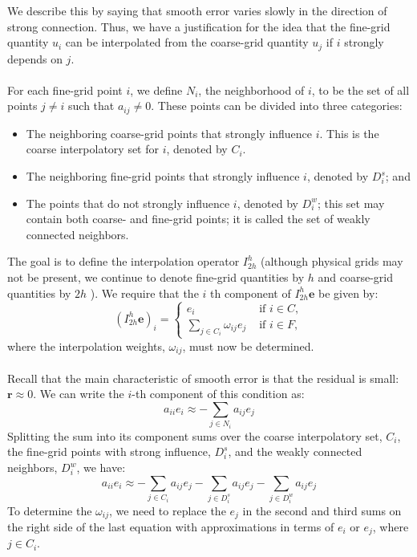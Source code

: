 \documentclass[11pt]{book}
\begin{document}
We describe this by saying that smooth error varies slowly in the direction of strong connection. Thus, we have a justification for the idea that the fine-grid quantity $u_{i}$ can be interpolated from the coarse-grid quantity $u_{j}$ if $i$ strongly depends on $j$.\\ \\
For each fine-grid point $i$, we define $N_{i}$, the neighborhood of $i$, to be the set of all points $j \neq i$ such that $a_{i j} \neq 0$. These points can be divided into three categories:
\begin{itemize}
  \item The neighboring coarse-grid points that strongly influence $i$. This is the coarse interpolatory set for $i$, denoted by $C_{i}$.

  \item The neighboring fine-grid points that strongly influence $i$, denoted by $D_{i}^{s}$; and

  \item The points that do not strongly influence $i$, denoted by $D_{i}^{w}$; this set may contain both coarse- and fine-grid points; it is called the set of weakly connected neighbors. 
\end{itemize}
The goal is to define the interpolation operator $I_{2 h}^{h}$ (although physical grids may not be present, we continue to denote fine-grid quantities by $h$ and coarse-grid quantities by $2 h$ ). We require that the $i$ th component of $I_{2 h}^{h} \mathbf{e}$ be given by:
$$
\left(I_{2 h}^{h} \mathbf{e}\right)_{i}=\left\{\begin{aligned}
e_{i} & \text { if } i \in C, \\
\sum_{j \in C_{i}} \omega_{i j} e_{j} & \text { if } i \in F,
\end{aligned}\right.
$$
where the interpolation weights, $\omega_{i j}$, must now be determined.\\ \\
Recall that the main characteristic of smooth error is that the residual is small: $\mathbf{r} \approx 0$. We can write the $i$-th component of this condition as:
$$
a_{i i} e_{i} \approx-\sum_{j \in N_{i}} a_{i j} e_{j}
$$
Splitting the sum into its component sums over the coarse interpolatory set, $C_{i}$, the fine-grid points with strong influence, $D_{i}^{s}$, and the weakly connected neighbors, $D_{i}^{w}$, we have:
$$
a_{i i} e_{i} \approx-\sum_{j \in C_{i}} a_{i j} e_{j}-\sum_{j \in D_{i}^{s}} a_{i j} e_{j}-\sum_{j \in D_{i}^{w}} a_{i j} e_{j}
$$
To determine the $\omega_{i j}$, we need to replace the $e_{j}$ in the second and third sums on the right side of the last equation with approximations in terms of $e_{i}$ or $e_{j}$, where $j \in C_{i}$.\\ \\
\end{document}
